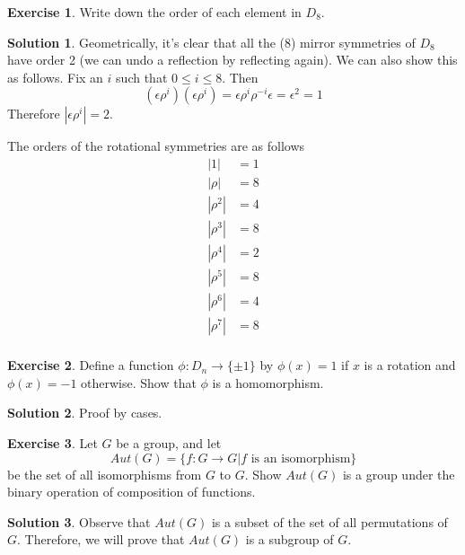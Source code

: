 \documentclass[12pt]{article}
\theoremstyle{definition}
\newtheorem{exercise}{Exercise}
\theoremstyle{definition}
\newtheorem{solution}{Solution}
\newcommand{\e}{\epsilon}
\begin{document}
\begin{exercise}
Write down the order of each element in $D_8$.
\end{exercise}
\begin{solution}
Geometrically, it's clear that all the ($8$) mirror symmetries of $D_8$ have order 2 (we can undo a reflection by reflecting again). We can also show this as follows. Fix an $i$ such that $0 \leq i \leq 8$. Then
\begin{equation}
	(\e \rho^i)(\e \rho^i) = \e \rho^i \rho^{-i} \e = \e^2 = 1	
\end{equation}
Therefore $|\e \rho^i| = 2$. 

The orders of the rotational symmetries are as follows
\begin{align*}
|1| &= 1 \\
|\rho| &= 8 \\
|\rho^2| &= 4 \\
|\rho^3| &= 8 \\
|\rho^4| &= 2 \\
|\rho^5| &= 8 \\
|\rho^6| &= 4 \\
|\rho^7| &= 8 \\
\end{align*}
\end{solution}

\begin{exercise}
Define a function $\phi : D_n \to \{\pm 1\}$ by $\phi(x) = 1$ if $x$ is a rotation and $\phi(x) = -1$ otherwise. Show that $\phi$ is a homomorphism.
\end{exercise}
\begin{solution}
Proof by cases. 
\end{solution}

\begin{exercise}
Let $G$ be a group, and let
\begin{equation}
	Aut(G) = \{f : G \to G | f \text{ is an isomorphism} \} 
\end{equation}
be the set of all isomorphisms from $G$ to $G$. Show $Aut(G)$ is a group under the binary operation of composition of functions. 
\end{exercise}

\begin{solution}
Observe that $Aut(G)$ is a subset of the set of all permutations of $G$. Therefore, we will prove that $Aut(G)$ is a subgroup of $G$. 
\end{solution}
\end{document}
